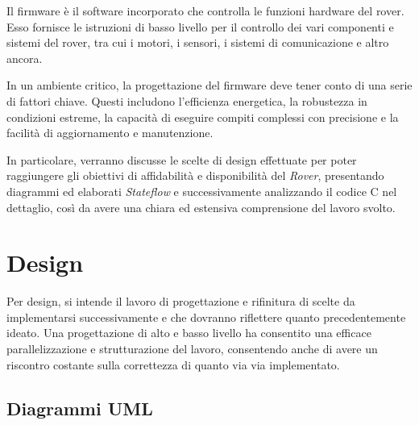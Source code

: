 \documentclass{article}
\begin{document}
  Il firmware è il software incorporato che controlla le funzioni hardware del rover. Esso fornisce le istruzioni di basso livello per il controllo dei vari componenti e sistemi del rover, tra cui i motori, i sensori, i sistemi di comunicazione e altro ancora.

  In un ambiente critico, la progettazione del firmware deve tener conto di una serie di fattori chiave. Questi includono l’efficienza energetica, la robustezza in condizioni estreme, la capacità di eseguire compiti complessi con precisione e la facilità di aggiornamento e manutenzione.

  In particolare, verranno discusse le scelte di design effettuate per poter raggiungere gli obiettivi di affidabilità e disponibilità del \textit{Rover}, presentando diagrammi ed elaborati \textit{Stateflow} e successivamente analizzando il codice C nel dettaglio, così da avere una chiara ed estensiva comprensione del lavoro svolto.
  \section{Design}
    Per design, si intende il lavoro di progettazione e rifinitura di scelte da implementarsi successivamente e che dovranno riflettere quanto precedentemente ideato. Una progettazione di alto e basso livello ha consentito una efficace parallelizzazione e strutturazione del lavoro, consentendo anche di avere un riscontro costante sulla correttezza di quanto via via implementato. 
    \subsection{Diagrammi UML}
\end{document}

